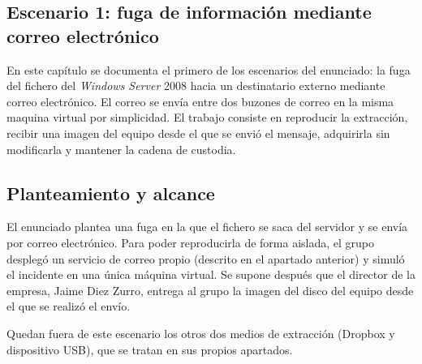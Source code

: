%

\providecommand{\cod}[1]{\texttt{\detokenize{#1}}}

\subsection{Escenario 1: fuga de información mediante correo electrónico}
\label{cap:correo}

En este capítulo se documenta el primero de los escenarios del enunciado: la
fuga del fichero \cod{Confidencial.pdf} del \textit{Windows Server} 2008 hacia
un destinatario externo mediante correo electrónico. El correo se envía entre dos buzones de correo en la misma maquina virtual por simplicidad. El trabajo consiste en reproducir la extracción,
recibir una imagen del equipo desde el que se envió el mensaje, adquirirla
sin modificarla y mantener la cadena de custodia.

\subsection{Planteamiento y alcance}
El enunciado plantea una fuga en la que el fichero se saca del servidor y se
envía por correo electrónico. Para poder reproducirla de forma aislada, el
grupo desplegó un servicio de correo propio (descrito en el apartado anterior)
y simuló el incidente en una única máquina virtual. Se supone después que el
director de la empresa, Jaime Diez Zurro, entrega al grupo la imagen del disco
del equipo desde el que se realizó el envío.

Quedan fuera de este escenario los otros dos medios de extracción (Dropbox y
dispositivo USB), que se tratan en sus propios apartados.

